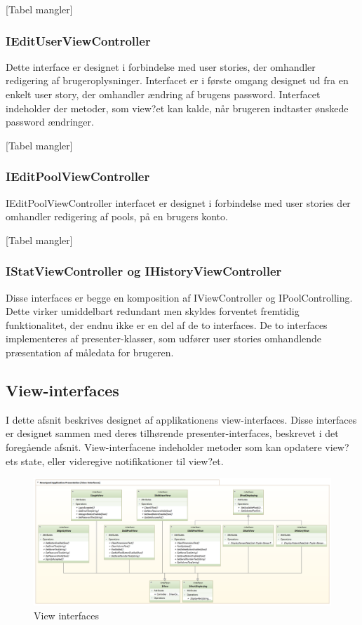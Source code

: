 [Tabel mangler]

\subsubsection{IEditUserViewController}
Dette interface er designet i forbindelse med user stories, der omhandler redigering af brugeroplysninger. Interfacet er i første omgang designet ud fra en enkelt user story, der omhandler ændring af brugens password. Interfacet indeholder der metoder, som view?et kan kalde, når brugeren indtaster ønskede password ændringer.

[Tabel mangler]

\subsubsection{IEditPoolViewController}
IEditPoolViewController interfacet er designet i forbindelse med user stories der omhandler redigering af pools, på en brugers konto.

[Tabel mangler]

\subsubsection{IStatViewController og IHistoryViewController}
Disse interfaces er begge en komposition af IViewController og IPoolControlling. Dette virker umiddelbart redundant men skyldes forventet fremtidig funktionalitet, der endnu ikke er en del af de to interfaces. De to interfaces implementeres af presenter-klasser, som udfører user stories omhandlende præsentation af måledata for brugeren.

\subsection{View-interfaces}
I dette afsnit beskrives designet af applikationens view-interfaces. Disse interfaces er designet sammen med deres tilhørende presenter-interfaces, beskrevet i det foregående afsnit. View-interfacene indeholder metoder som kan opdatere view?ets state, eller videregive notifikationer til view?et.

\begin{figure}
	\centering
	\includegraphics[width=1.0\linewidth]{figs/design/application_view_interfaces}
	\caption{View interfaces}
	\label{fig:application_view_interfaces}
\end{figure}

